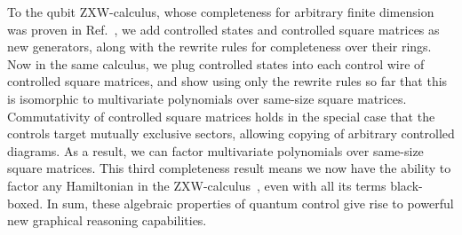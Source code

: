 To the qubit ZXW-calculus, whose completeness for arbitrary finite dimension was proven in Ref.~\cite{poor2023completeness}, we add controlled states and controlled square matrices as new generators, along with the rewrite rules for completeness over their rings.
Now in the same calculus, we plug controlled states into each control wire of controlled square matrices, and show using only the rewrite rules so far that this is isomorphic to multivariate polynomials over same-size square matrices. Commutativity of controlled square matrices holds in the special case that the controls target mutually exclusive sectors, allowing copying of arbitrary controlled diagrams. As a result, we can factor multivariate polynomials over same-size square matrices. This third completeness result means we now have the ability to factor any Hamiltonian in the ZXW-calculus~\cite{shaikh2022sum}, even with all its terms black-boxed.
In sum, these algebraic properties of quantum control give rise to powerful new graphical reasoning capabilities.